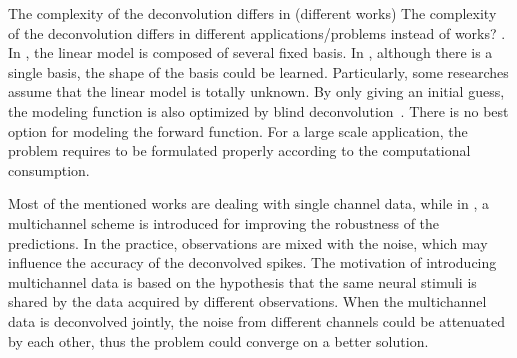 \documentclass[10pt,conference]{ieeeconf}
\begin{document}
The complexity of the deconvolution differs in (different works) {\color{red}The complexity of the deconvolution differs in different applications/problems instead of works?} . In \cite{hernando2017feature}, the linear model is composed of several fixed basis. In \cite{greco2014electrodermal,greco2015cvxeda,amin2019tonic,wickramasuriya2019skin,kazemipour2017fast,amin2019robust}, although there is a single basis, the shape of the basis could be learned. Particularly, some researches assume that the linear model is totally unknown. By only giving an initial guess, the modeling function is also optimized by blind deconvolution~\cite{kaur2016remote,friedrich2017fast}. There is no best option for modeling the forward function. For a large scale application, the problem requires to be formulated properly according to the computational consumption.

Most of the mentioned works are dealing with single channel data, while in \cite{friedrich2017fast,amin2019robust}, a multichannel scheme is introduced for improving the robustness of the predictions. In the practice, observations are mixed with the noise, which may influence the accuracy of the deconvolved spikes. The motivation of introducing multichannel data is based on the hypothesis that the same neural stimuli is shared by the data acquired by different observations. When the multichannel data is deconvolved jointly, the noise from different channels could be attenuated by each other, thus the problem could converge on a better solution.
\end{document}
